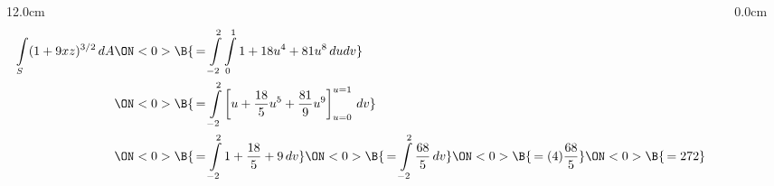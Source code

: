 \begin{frame}
\begin{columns}
\begin{column}{12.0cm}
\begin{align*} 
	\int \limits_{S} (1 + 9xz)^{3/2} \, dA
	&\ON<0>{\B{\, = \int \limits_{-2}^{2}\int \limits_{0}^{1} 1 + 18u^4 + 81u^8 \, dudv}} \\
	&\ON<0>{\B{\, = \int \limits_{-2}^{2} \left[u + \frac{18}{5}u^5 + \frac{81}{9}u^9 \right]_{u=0}^{u=1} \, dv}} \\
	&\ON<0>{\B{\, = \int \limits_{-2}^{2} 1 + \frac{18}{5} + 9 \, dv}}
	\ON<0>{\B{\, = \int \limits_{-2}^{2} \frac{68}{5} \, dv}}
	\ON<0>{\B{\, = (4)\frac{68}{5}}} 
	\ON<0>{\B{\, = 272}}
\end{align*}

\end{column}\begin{column}{0.0cm}\end{column}\end{columns}
\end{frame}

